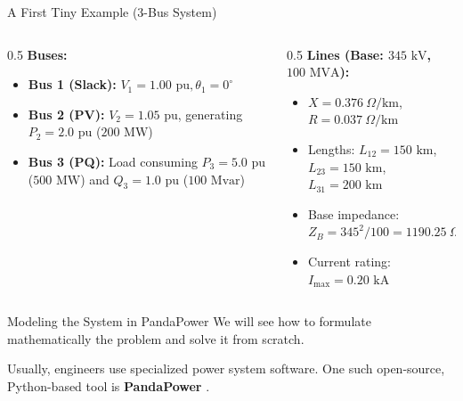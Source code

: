 \begin{frame}[allowframebreaks]{A First Tiny Example (3-Bus System)}
    \begin{center}
        
    \end{center}
    
    \begin{columns}
        \begin{column}{0.5\linewidth}
            \textbf{Buses:}
            \begin{itemize}
                \item \textbf{Bus 1 (Slack):} $V_1 = 1.00\text{ pu}, \theta_1 = 0^\circ$
                \item \textbf{Bus 2 (PV):} $V_2 = 1.05\text{ pu}$, generating $P_2 = 2.0\text{ pu}$ ($200\text{ MW}$)
                \item \textbf{Bus 3 (PQ):} Load consuming $P_3 = 5.0\text{ pu}$ ($500\text{ MW}$) and $Q_3 = 1.0\text{ pu}$ ($100\text{ Mvar}$)
            \end{itemize}
        \end{column}
        \begin{column}{0.5\linewidth}
            \textbf{Lines (Base: $345\text{ kV}$, $100\text{ MVA}$):}
            \begin{itemize}
                \item $X = 0.376\ \Omega/\text{km}$, $R = 0.037\ \Omega/\text{km}$
                \item Lengths: $L_{12} = 150\text{ km}$, $L_{23} = 150\text{ km}$, $L_{31} = 200\text{ km}$
                \item Base impedance: $Z_B = 345^2 / 100 = 1190.25\ \Omega$
                \item Current rating: $I_{\max} = 0.20\text{ kA}$
            \end{itemize}
        \end{column}
    \end{columns}
\end{frame}

\begin{frame}{Modeling the System in PandaPower}
    We will see how to formulate mathematically the problem and solve it from scratch.
    
    Usually, engineers use specialized power system software. One such open-source, Python-based tool is \textbf{PandaPower} \cite{thurner2018pandapower}.

    \begin{center}
        \vspace{0.3cm}
        \href{https://colab.research.google.com/drive/103VIzly2huoS-PjnYdbCaeBS1dunJS7H?usp=sharing}{}
        
        \vspace{0.25cm}
        \href{https://github.com/bcornelusse/ELEC0447-analysis-power-systems/tree/master/notebooks/power_flow_3-bus_pandapower.ipynb}{}
    \end{center}
\end{frame}

